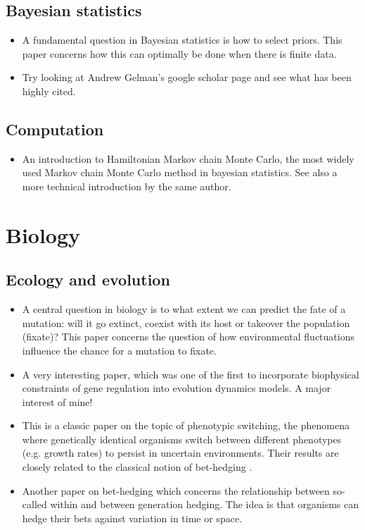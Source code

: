 \documentclass{amsart}
\begin{document}
\subsection{Bayesian statistics}
\begin{itemize}
\item \cite{Mattingly2018} A fundamental question in Bayesian statistics is how to select priors. This paper concerns how this can optimally be done when there is finite data. 
\item Try looking at Andrew Gelman's google scholar page and see what has been highly cited. 
\end{itemize}


\subsection{Computation}

\begin{itemize}
\item \cite{Betancourt2017aa} An introduction to Hamiltonian Markov chain Monte Carlo, the most widely used Markov chain Monte Carlo method in bayesian statistics. See also a more technical introduction by the same author.
\end{itemize}

\section{Biology}

\subsection{Ecology and evolution}

\begin{itemize}
\item \cite{cvijovi2015} A central question in biology is to what extent we can predict the fate of a mutation: will it go extinct, coexist with its host or takeover the population (fixate)? This paper concerns the question of how environmental fluctuations influence the chance for a mutation to fixate.
\item \cite{lassig2007}  A very interesting paper, which was one of the first to incorporate biophysical constraints of gene regulation into evolution dynamics models. A major interest of mine! 
\item \cite{kussell2005b} This is a classic paper on the topic of phenotypic switching, the phenomena where genetically identical organisms switch between different phenotypes (e.g. growth rates) to persist in uncertain environments. Their results are closely related to the classical notion of bet-hedging \cite{kelly1956}. 
\item \cite{schreiber2015} Another paper on bet-hedging which concerns the relationship between so-called within and between generation hedging. The idea is that organisms can hedge their bets against variation in time or space. 
\end{itemize}
\end{document}

